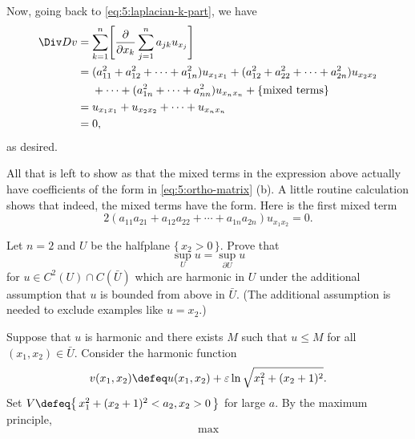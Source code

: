 \begin{solution}
  Now, going back to \eqref{eq:5:laplacian-k-part}, we have
  \begin{align*}
    \Div Dv
    &=\sum_{k=1}^n\Biggl[\frac{\partial}{\partial x_k}\sum_{j=1}^n
      a_{jk}u_{x_j}\Biggr]\\
    &=(a_{11}^2+a_{12}^2+\dotsb+a_{1n}^2)u_{x_1x_1}+(a_{12}^2+a_{22}^2+\dotsb+a_{2n}^2)u_{x_2x_2}\\
    &\phantom{{}={}}+\dotsb+(a_{1n}^2+\dotsb+a_{nn}^2)u_{x_nx_n}+\{\text{mixed
      terms}\}\\
    &=u_{x_1x_1}+u_{x_2x_2}+\dotsb+u_{x_nx_n}\\
    &=0,
  \end{align*}
  as desired.

  All that is left to show as that the mixed terms in the expression above
  actually have coefficients of the form in \eqref{eq:5:ortho-matrix}
  (b). A little routine calculation shows that indeed, the mixed terms have
  the form. Here is the first mixed term
  \[
    2(a_{11}a_{21}+a_{12}a_{22}+\dotsb+a_{1n}a_{2n})u_{x_1x_2}
    =0.
  \]
\end{solution}
\newpage

\begin{problem}
  Let \(n=2\) and \(U\) be the halfplane \(\{\,x_2>0\,\}\). Prove that
  \[
    \sup_U u=\sup_{\partial U}u
  \]
  for \(u\in C^2(U)\cap C(\bar U)\) which are harmonic in \(U\) under the
  additional assumption that \(u\) is bounded from above in \(\bar
  U\). (The additional assumption is needed to exclude examples like
  \(u=x_2\).)

\end{problem}
\begin{solution}
  Suppose that \(u\) is harmonic and there exists \(M\) such that
  \(u\leq M\) for all \((x_1,x_2)\in\bar U\). Consider the harmonic
  function
  \[
    v(x_1,x_2)\defeq
    u(x_1,x_2)+\varepsilon\ln\sqrt{x_1^2+(x_2+1)^2}.
  \]
  Set \(V\defeq \bigl\{\,x_1^2+(x_2+1)^2<a_2,x_2>0\,\bigr\}\) for large
  \(a\). By the maximum principle,
  \[
    \max_{}
  \]
\end{solution}
\newpage

